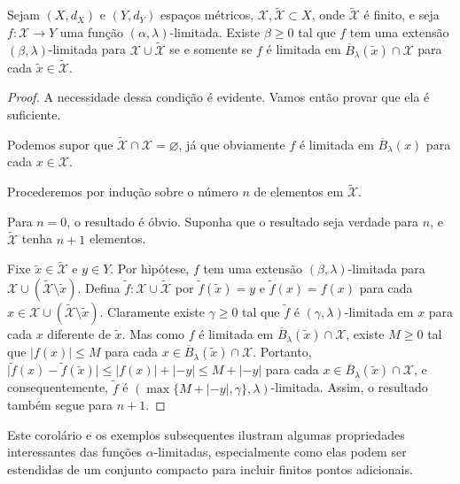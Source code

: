 

\begin{theorem} \label{tietze}
  Sejam $(X,d_X)$ e $(Y, d_Y)$ espaços métricos, $\mathcal{X}, \tilde{\mathcal{X}} \subset X$, onde $\tilde{\mathcal{X}}$ é finito, e seja $f : \mathcal{X} \to Y$ uma função $(\alpha,\lambda)$-limitada. Existe $\beta \ge 0$ tal que $f$ tem uma extensão $(\beta,\lambda)$-limitada para $\mathcal{X} \cup \tilde{\mathcal{X}}$ se e somente se $f$ é limitada em $\overline{B}_{\lambda}(\tilde{x}) \cap \mathcal{X}$ para cada $\tilde{x} \in \tilde{\mathcal{X}}$.
\end{theorem}

\begin{proof}
  A necessidade dessa condição é evidente. Vamos então provar que ela é suficiente.

  Podemos supor que $\tilde{\mathcal{X}} \cap \mathcal{X} = \varnothing$, já que obviamente $f$ é limitada em $\overline{B}_{\lambda}(x)$ para cada $x \in \mathcal{X}$.

  Procederemos por indução sobre o número $n$ de elementos em $\tilde{\mathcal{X}}$.

  Para $n = 0$, o resultado é óbvio. Suponha que o resultado seja verdade para $n$, e $\tilde{\mathcal{X}}$ tenha $n+1$ elementos.

  Fixe $\tilde{x} \in \tilde{\mathcal{X}}$ e $y \in Y$. Por hipótese, $f$ tem uma extensão $(\beta,\lambda)$-limitada para $\mathcal{X} \cup (\tilde{\mathcal{X}} \setminus {\tilde{x}})$. Defina $\tilde{f} : \mathcal{X} \cup \tilde{\mathcal{X}}$ por $\tilde{f}(\tilde{x}) = y$ e $\tilde{f}(x) = f(x)$ para cada $x \in \mathcal{X} \cup (\tilde{\mathcal{X}} \setminus {\tilde{x}})$. Claramente existe $\gamma \ge 0$ tal que $\tilde{f}$ é $(\gamma,\lambda)$-limitada em $x$ para cada $x$ diferente de $\tilde{x}$. Mas como $f$ é limitada em $\overline{B}_{\lambda}(\tilde{x}) \cap \mathcal{X}$, existe $M \ge 0$ tal que $\lvert f(x) \rvert \le M$ para cada $x \in \overline{B}_{\lambda}(\tilde{x}) \cap \mathcal{X}$. Portanto, $\lvert \tilde{f}(x)-\tilde{f}(\tilde{x})\rvert \le \lvert f(x)\rvert + \lvert -y\rvert \le M + \lvert-y\rvert$ para cada $x \in \overline{B}_{\lambda}(\tilde{x}) \cap \mathcal{X}$, e consequentemente, $\tilde{f}$ é $(\max\{M + \lvert-y\rvert, \gamma\},\lambda)$-limitada. Assim, o resultado também segue para $n+1$.
\end{proof}

Este corolário e os exemplos subsequentes ilustram algumas propriedades interessantes das funções $\alpha$-limitadas, especialmente como elas podem ser estendidas de um conjunto compacto para incluir finitos pontos adicionais.

